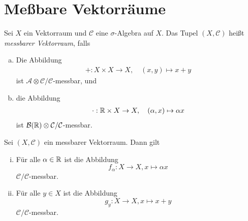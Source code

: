 \section{Meßbare Vektorräume}

\begin{mydef}
    Sei $X$ ein Vektorraum und $\mathcal{C}$ eine $\sigma$-Algebra auf $X$. Das Tupel $(X, \mathcal{C})$ heißt \textit{messbarer Vektorraum}, falls
    \begin{enumerate}[(a)]
        \item Die Abbildung 
        \begin{align*}
            + : X \times X \to X, \quad (x,y) \mapsto x + y
        \end{align*}
        ist $\mathcal{A}\otimes \mathcal{C}/\mathcal{C}$-messbar, und
        \item die Abbildung 
        \begin{align*}
            \cdot : \mathbb{R} \times X \to X, \quad  (\alpha, x) \mapsto \alpha x
        \end{align*}
        ist $\mathcal{B}(\mathbb{R}) \otimes \mathcal{C}/\mathcal{C}$-messbar. 
    \end{enumerate}
\end{mydef}

\begin{remark}
    Sei $(X, \mathcal{C})$ ein messbarer Vektorraum. Dann gilt
    \begin{enumerate}[(i)]
        \item Für alle $\alpha \in \mathbb{R}$ ist die Abbildung 
            $$f_{\alpha}: X \to X, x \mapsto \alpha x$$
        $\mathcal{C}/\mathcal{C}$-messbar. 
        \item Für alle $y \in X$ ist die Abbildung 
            $$g_y: X \to X, x \mapsto x + y$$
        $\mathcal{C}/\mathcal{C}$-messbar.
    \end{enumerate}
\end{remark}


